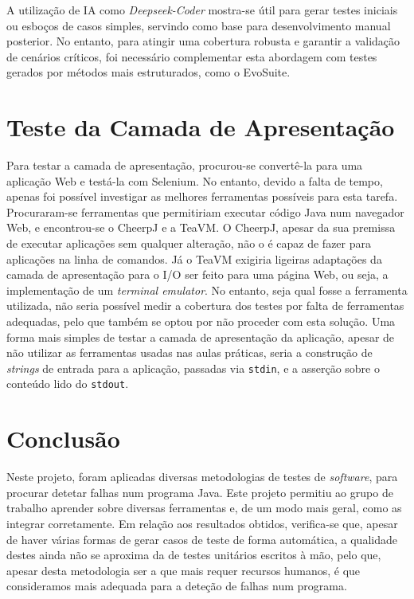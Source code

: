 \documentclass[12pt, a4paper]{article}
\begin{document}
A utilização de IA como \textit{Deepseek-Coder} mostra-se útil para gerar testes iniciais ou esboços
de casos simples, servindo como base para desenvolvimento manual posterior. No entanto, para atingir
uma cobertura robusta e garantir a validação de cenários críticos, foi necessário complementar esta
abordagem com testes gerados por métodos mais estruturados, como o EvoSuite.

\section{Teste da Camada de Apresentação}

Para testar a camada de apresentação, procurou-se convertê-la para uma aplicação Web e testá-la
com Selenium. No entanto, devido a falta de tempo, apenas foi possível investigar as melhores
ferramentas possíveis para esta tarefa. Procuraram-se ferramentas que permitiriam executar código
Java num navegador Web, e encontrou-se o CheerpJ e a TeaVM. O CheerpJ, apesar da sua premissa de
executar aplicações sem qualquer alteração, não o é capaz de fazer para aplicações na linha de
comandos. Já o TeaVM exigiria ligeiras adaptações da camada de apresentação para o I/O ser feito
para uma página Web, ou seja, a implementação de um \emph{terminal emulator}. No entanto, seja qual
fosse a ferramenta utilizada, não seria possível medir a cobertura dos testes por falta de
ferramentas adequadas, pelo que também se optou por não proceder com esta solução. Uma forma mais
simples de testar a camada de apresentação da aplicação, apesar de não utilizar as ferramentas
usadas nas aulas práticas, seria a construção de \emph{strings} de entrada para a aplicação,
passadas via \texttt{stdin}, e a asserção sobre o conteúdo lido do \texttt{stdout}.

\section{Conclusão}

Neste projeto, foram aplicadas diversas metodologias de testes de \emph{software}, para procurar
detetar falhas num programa Java. Este projeto permitiu ao grupo de trabalho aprender sobre
diversas ferramentas e, de um modo mais geral, como as integrar corretamente. Em relação aos
resultados obtidos, verifica-se que, apesar de haver várias formas de gerar casos de teste de forma
automática, a qualidade destes ainda não se aproxima da de testes unitários escritos à mão, pelo
que, apesar desta metodologia ser a que mais requer recursos humanos, é que consideramos mais
adequada para a deteção de falhas num programa.
\end{document}
